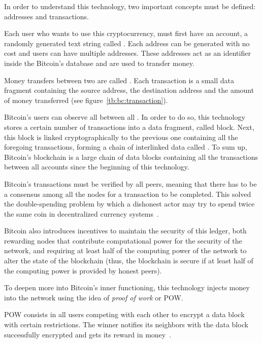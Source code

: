In order to understand this technology, two important concepts must be defined:
addresses and transactions.

Each user who wants to use this cryptocurrency, must first have an account, a
randomly generated text string called . Each address can be
generated with no cost and users can have multiple addresses. These addresses
act as an identifier inside the Bitcoin's database and are used to transfer
money.


Money transfers between two  are called . Each
transaction is a small data fragment containing the source address, the
destination address and the amount of money transferred (see
figure~\ref{tb:bc:transaction}).

Bitcoin's users can observe all  between all . In
order to do so, this technology stores a certain number of transactions into a
data fragment, called block. Next, this block is linked cryptographically to the
previous one containing all the foregoing transactions, forming a chain of
interlinked data called . To sum up, Bitcoin's blockchain is a
large chain of data blocks containing all the transactions between all accounts
since the beginning of this technology.

Bitcoin's transactions must be verified by all peers, meaning that there has to
be a consensus among all the nodes for a transaction to be completed. This
solved the double-spending problem by which a dishonest actor may try to spend
twice the same coin in decentralized currency systems~\cite{chohan2017double}.

Bitcoin also introduces incentives to maintain the security of this ledger, both
rewarding nodes that contribute computational power for the security of the
network, and requiring at least half of the computing power of the network to
alter the state of the blockchain (thus, the blockchain is secure if at least
half of the computing power is provided by honest peers).

To deepen more into Bitcoin's inner functioning, this technology injects money
into the network using the idea of \emph{proof of work} or POW.

POW consists in all users competing with each other to encrypt a data block with
certain restrictions. The winner notifies its neighbors with the data block
successfully encrypted and gets its reward in money~\cite{barber2012bitter}.


